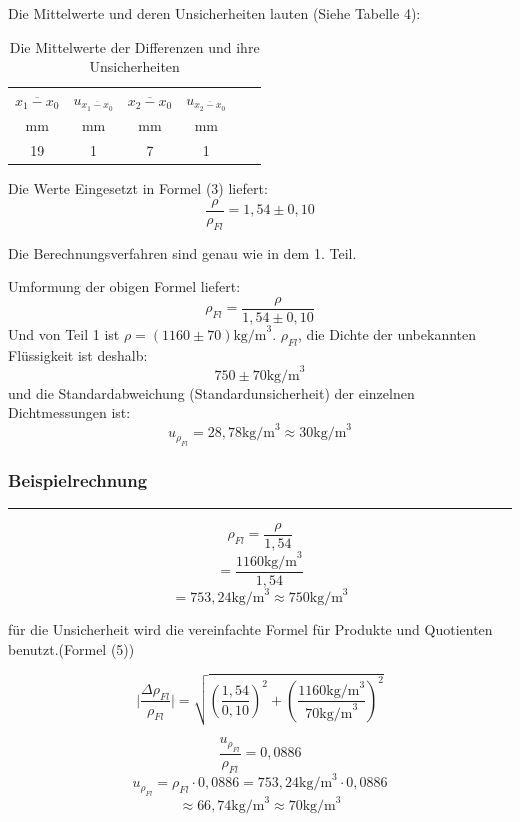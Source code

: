 \documentclass[11pt,a4paper]{article} %
\begin{document}
Die Mittelwerte und deren Unsicherheiten lauten (Siehe Tabelle 4):


\begin{table}[ht]
	\begin{tabular*}{0.99\textwidth}{@{\extracolsep{\fill}}cccccc}
		\toprule
		$\overline{x_1-x_0}$ & $u_{\overline{x_1-x_0}}$ &  $\overline{x_2-x_0}$  &  $u_{\overline{x_2-x_0}}$  \\
		mm & mm &  mm & mm   \\
		\midrule
		19 & 1 & 7 & 1 \\
		
		\bottomrule
	\end{tabular*}
	\caption{Die Mittelwerte der Differenzen und ihre Unsicherheiten}
	\label{tabelle4}
\end{table}

Die Werte Eingesetzt in Formel (3) liefert:
$$\frac{\rho}{\rho_{Fl}}=1,54\pm0,10$$

Die Berechnungsverfahren sind genau wie in dem 1. Teil. 

Umformung der obigen Formel liefert:
$$\rho_{Fl}=\frac{\rho}{1,54\pm0,10}$$
Und von Teil 1 ist $\rho=(1160\pm70) \textrm{kg/m}^3$. $\rho_{Fl}$, die Dichte der unbekannten Flüssigkeit ist deshalb:
$$750 \pm 70 \textrm{kg/m}^3$$
und die Standardabweichung (Standardunsicherheit) der einzelnen Dichtmessungen ist:
$$u_{\rho_{Fl}}=28,78\textrm{kg/m}^3\approx30\textrm{kg/m}^3$$

\subsubsection{Beispielrechnung}

\hrule
\begin{tcolorbox}[colback=white]
$$\rho_{Fl}=\frac{\rho}{1,54}$$
$$=\frac{1160 \textrm{kg/m}^3 }{1,54}$$
$$=753,24 \textrm{kg/m}^3\approx 750 \textrm{kg/m}^3$$

für die Unsicherheit wird die vereinfachte Formel für Produkte und Quotienten benutzt.(Formel (5))


$$\vert\frac{\Delta{\rho_{Fl}}}{\rho_{Fl}}\vert = \sqrt{(\frac{1,54}{0,10})^2+(\frac{1160 \textrm{kg/m}^3}{70\textrm{kg/m}^3})^2}$$

$$\frac{u_{\rho_{Fl}}}{\rho_{Fl}} = 0,0886$$
$$u_{\rho_{Fl}}={\rho_{Fl}}\cdot0,0886=753,24\textrm{kg/m}^3\cdot0,0886$$
$$\approx66,74\textrm{kg/m}^3\approx70\textrm{kg/m}^3$$
\end{tcolorbox}
\end{document}
